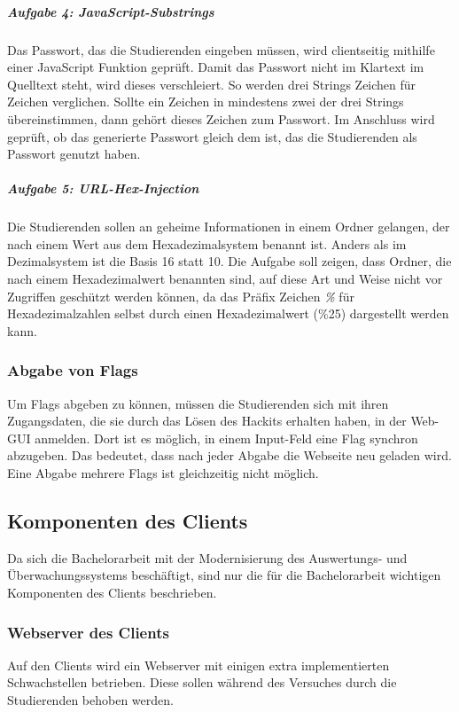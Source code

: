 \subparagraph{Aufgabe 4: JavaScript-Substrings}\label{subpara:Aufgabe_4_JavaScript-Substrings}
Das Passwort, das die Studierenden eingeben müssen, wird clientseitig mithilfe einer JavaScript Funktion geprüft. Damit das Passwort nicht im Klartext im Quelltext steht, wird dieses verschleiert. So werden drei Strings Zeichen für Zeichen verglichen. Sollte ein Zeichen in mindestens zwei der drei Strings übereinstimmen, dann gehört dieses Zeichen zum Passwort. Im Anschluss wird geprüft, ob das generierte Passwort gleich dem ist, das die Studierenden als Passwort genutzt haben. \cite[S.20]{abtsUeberarbeitungUndErweiterung2016}

\subparagraph{Aufgabe 5: URL-Hex-Injection}\label{subpara:Aufgabe_5_URL-Hex-Injection}
Die Studierenden sollen an geheime Informationen in einem Ordner gelangen, der nach einem Wert aus dem Hexadezimalsystem benannt ist. Anders als im Dezimalsystem ist die Basis 16 statt 10. Die Aufgabe soll zeigen, dass Ordner, die nach einem Hexadezimalwert benannten sind, auf diese Art und Weise nicht vor Zugriffen geschützt werden können, da das Präfix Zeichen \textit{\%} für Hexadezimalzahlen selbst durch einen Hexadezimalwert (\%25) dargestellt werden kann. \cite[S.20]{abtsUeberarbeitungUndErweiterung2016}

\subsubsection{Abgabe von Flags}\label{subsubsec:Abgabe_von_Flags}
Um Flags abgeben zu können, müssen die Studierenden sich mit ihren Zugangsdaten, die sie durch das Lösen des Hackits erhalten haben, in der Web-GUI anmelden. Dort ist es möglich, in einem Input-Feld eine Flag synchron abzugeben. Das bedeutet, dass nach jeder Abgabe die Webseite neu geladen wird. Eine Abgabe mehrere Flags ist gleichzeitig nicht möglich.

\subsection{Komponenten des Clients}\label{subsec:Komponente_des_Clients}
Da sich die Bachelorarbeit mit der Modernisierung des Auswertungs- und Überwachungssystems beschäftigt, sind nur die für die Bachelorarbeit wichtigen Komponenten des Clients beschrieben.

\subsubsection{Webserver des Clients}\label{subsubsec:Webserver_des_Clients}
Auf den Clients wird ein Webserver mit einigen extra implementierten Schwachstellen betrieben. Diese sollen während des Versuches durch die Studierenden behoben werden.

